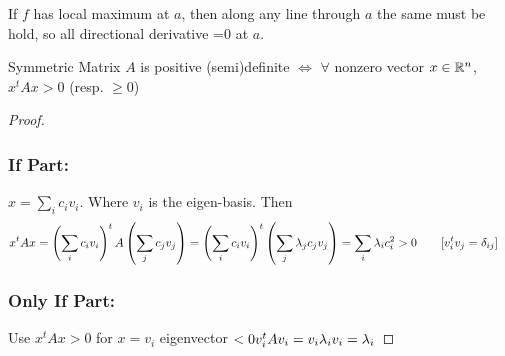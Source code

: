 If $f$ has local maximum  at $a$, then along any line through $a$ the same must be hold, so all directional derivative =0 at $a$.

\begin{claim}{}{}
	Symmetric Matrix  $A$ is positive (semi)definite $\iff $ $\forall$ nonzero vector $x\in \mathbb{R}^n$, $x^tAx>0$ (resp. $\geq 0$)
\end{claim}
\begin{proof}
	\subsubsection*{If Part:}
	$x=\sum\limits_{i}c_iv_i$. Where $v_i$ is the eigen-basis. Then \begin{align*}
		x^tAx & = \left(\sum\limits_{i}c_iv_i\right)^tA\left(\sum\limits_{j}c_jv_j\right) = \left(\sum\limits_{i}c_iv_i\right)^t\left( \sum_j\lambda_jc_jv_j \right) = \sum_i\lambda_ic_i^2>0 \qquad [v_i^tv_j=\delta_{ij}]
	\end{align*}
\subsubsection*{Only If Part:}
Use $x^tAx>0$  for $x=v_i$ eigenvector $<0v_i^tAv_i=v_i\lambda_iv_i=\lambda_i$
\end{proof}



